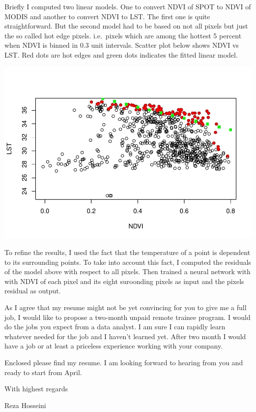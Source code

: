 \documentclass[]{article}
\begin{document}
Briefly I computed two linear models. One to convert NDVI of SPOT to
NDVI of MODIS and another to convert NDVI to LST. The first one is quite
straightforward. But the second model had to be based on not all pixels
but just the so called hot edge pixels. i.e.~pixels which are among the
hottest 5 percent when NDVI is binned in 0.3 unit intervals. Scatter
plot below shows NDVI vs LST. Red dots are hot edges and green dots
indicates the fitted linear model.

\includegraphics{zapier_files/figure-latex/unnamed-chunk-1-1.pdf}

To refine the results, I used the fact that the temperature of a point
is dependent to its surrounding points. To take into account this fact,
I computed the residuals of the model above with respect to all pixels.
Then trained a neural network with with NDVI of each pixel and its eight
suroonding pixels as input and the pixels residual as output.

As I agree that my resume might not be yet convincing for you to give me
a full job, I would like to propose a two-month unpaid remote trainee
program. I would do the jobs you expect from a data analyst. I am sure I
can rapidly learn whatever needed for the job and I haven't learned yet.
After two month I would have a job or at least a priceless experience
working with your company.

Enclosed please find my resume. I am looking forward to hearing from you
and ready to start from April.

With highest regards

Reza Hosseini
\end{document}
